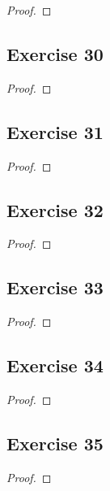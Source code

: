 \documentclass[14pt]{extarticle}
\begin{document}
\begin{proof}

\end{proof}

\subsection{Exercise 30}

\begin{proof}

\end{proof}

\subsection{Exercise 31}

\begin{proof}

\end{proof}

\subsection{Exercise 32}

\begin{proof}

\end{proof}

\subsection{Exercise 33}

\begin{proof}

\end{proof}

\subsection{Exercise 34}

\begin{proof}

\end{proof}

\subsection{Exercise 35}

\begin{proof}

\end{proof}
\end{document}
